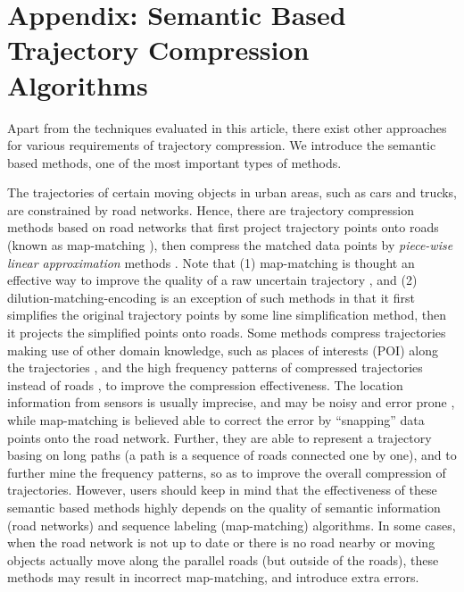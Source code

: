 \section*{{Appendix: Semantic Based Trajectory Compression Algorithms}}
{Apart from the techniques evaluated in this article, there exist other approaches for various requirements of trajectory compression. We introduce the semantic based methods, one of the most important types of methods.}

{The trajectories of certain moving objects in urban areas, such as cars and trucks, are constrained by road networks. Hence, there are trajectory compression methods based on road networks \cite{Chen:Trajectory, Popa:Spatio,Civilis:Techniques,Hung:Clustering, Kellaris:Map, Song:PRESS, Han:Compress, Cao:Road, Li:Uncertain} that first project trajectory points onto roads (known as map-matching \cite{Quddus:MapMatching}), then compress the matched data points by \emph{piece-wise linear approximation} methods \cite{Elmeleegy:Stream, Xie:Stream,Luo:Streaming,ORourke:Fitting}. 
Note that {(1) map-matching is thought an effective way to improve the quality of a raw uncertain trajectory \cite{Li:Uncertain}, and (2)} dilution-matching-encoding \cite{Gotsman:Compaction} is an exception of such methods in that it first simplifies the original trajectory points by some line simplification method, then it projects the simplified points onto roads.}
%
{Some methods \cite{Schmid:Semantic, Richter:Semantic} compress trajectories making use of other domain knowledge, such as places of interests (POI) along the trajectories \cite{Richter:Semantic}, and the high frequency patterns of compressed trajectories instead of roads \cite{Gotsman:Compaction, Song:PRESS, Han:Compress,Koide:CiNCT}, to improve the compression effectiveness.}
%
{The location information from sensors is usually imprecise, and may be noisy and error prone \cite{Cao:Road}, while map-matching is believed able to correct the error by ``snapping'' data points onto the road network. Further, they are able to represent a trajectory basing on long paths (a path is a sequence of roads connected one by one), and to further mine the frequency patterns, so as to improve the overall compression of trajectories.}
%
{However, users should keep in mind that the effectiveness of these semantic based methods highly depends on the quality of semantic information (\eg road networks) and sequence labeling (\eg map-matching) algorithms. In some cases, \eg when the road network is not up to date or there is no road nearby or moving objects actually move along the parallel roads (but outside of the roads), these methods may result in incorrect map-matching, and introduce extra errors.}

